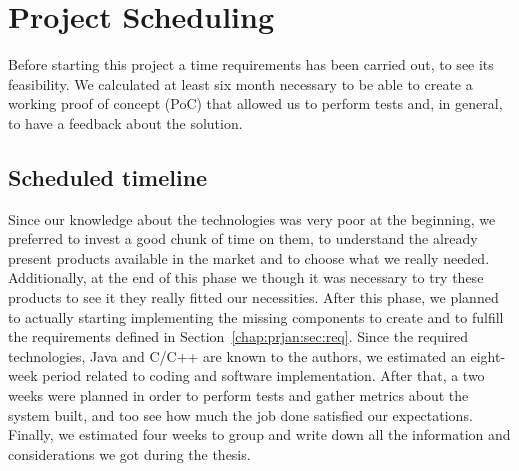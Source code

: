\section{Project Scheduling}
\label{chap:prjan:sec:prjsche}

Before starting this project a time requirements has been carried out, to see
its feasibility. We calculated at least six month necessary to be able to create
a working proof of concept (PoC) that allowed us to perform tests and, in
general, to have a feedback about the solution.

\subsection{Scheduled timeline}
Since our knowledge about the technologies was very poor at the beginning, we
preferred to invest a good chunk of time on them, to understand the already
present products available in the market and to choose what we really needed.
Additionally, at the end of this phase we though it was necessary to try these
products to see it they really fitted our necessities. After this phase, we
planned to actually starting implementing the missing components to create and
to fulfill the requirements defined in Section~\ref{chap:prjan:sec:req}. Since
the required technologies, Java and C/C++ are known to the authors, we estimated
an eight-week period related to coding and software implementation. After that,
a two weeks were planned in order to perform tests and gather metrics about the
system built, and too see how much the job done satisfied our expectations.
Finally, we estimated four weeks to group and write down all the information and
considerations we got during the thesis.

